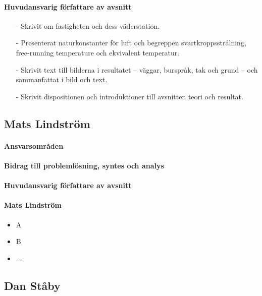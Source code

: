 \documentclass[12pt,a4paper]{article}
\begin{document}
\paragraph{Huvudansvarig författare av avsnitt}

\begin{itemize}
\item[-] Skrivit om fastigheten och dess väderstation.
\item[-] Presenterat naturkonstanter för luft och begreppen svartkroppsstrålning, free-running temperature och ekvivalent temperatur.
\item[-] Skrivit text till bilderna i resultatet – väggar, burspråk, tak och grund – och sammanfattat i bild och text.
\item[-] Skrivit dispositionen och introduktioner till avsnitten teori och resultat.
\end{itemize}


\subsection*{Mats Lindström}

\paragraph{Ansvarsområden}

\paragraph{Bidrag till problemlösning, syntes och analys}

\paragraph{Huvudansvarig författare av avsnitt}


\paragraph{Mats Lindström}
\begin{itemize}
\item A
\item B
\item ...
\end{itemize}



\subsection*{Dan Ståby}
\end{document}
